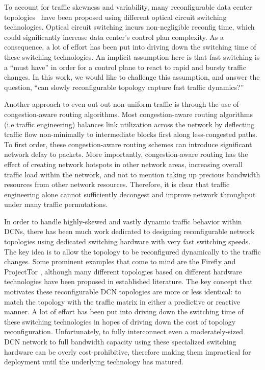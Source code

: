 \documentclass[sigconf]{acmart}
\theoremstyle{definition}
\begin{document}
To account for traffic skewness and variability, many reconfigurable data center topologies~\cite{farrington2011helios, cthrough_wang_2011, reactor_liu2014, hamedazimi2014firefly, ghobadi2016projector} have been proposed using different optical circuit switching technologies. Optical circuit switching incurs non-negligible reconfig time, which could significantly increase data center's control plan complexity. As a consequence, a lot of effort has been put into driving down the switching time of these switching technologies. An implicit assumption here is that fast switching is a ``must have'' in order for a control plane to react to rapid and bursty traffic changes. In this work, we would like to challenge this assumption, and answer the question, ``can slowly reconfigurable topology capture fast traffic dynamics?''

Another approach to even out out non-uniform traffic is through the use of congestion-aware routing algorithms. Most congestion-aware routing algorithms (i.e traffic engineering) balances link utilization across the network by deflecting traffic flow non-minimally to intermediate blocks first along less-congested paths. To first order, these congestion-aware routing schemes can introduce significant network delay to packets. More importantly, congestion-aware routing has the effect of creating network hotspots in other network areas, increasing overall traffic load within the network, and not to mention taking up precious bandwidth resources from other network resources. Therefore, it is clear that traffic engineering alone cannot sufficiently decongest and improve network throughput under many traffic permutations. 

In order to handle highly-skewed and vastly dynamic traffic behavior within DCNs, there has been much work dedicated to designing reconfigurable network topologies using dedicated switching hardware with very fast switching speeds. The key idea is to allow the topology to be reconfigured dynamically to the traffic changes. Some prominent examples that come to mind are the Firefly \cite{hamedazimi2014firefly} and ProjectTor \cite{ghobadi2016projector}, although many different topologies based on different hardware technologies have been proposed in established literature. The key concept that motivates these reconfigurable DCN topologies are more or less identical: to match the topology with the traffic matrix in either a predictive or reactive manner. A lot of effort has been put into driving down the switching time of these switching technologies in hopes of driving down the cost of topology reconfiguration. Unfortunately, to fully interconnect even a moderately-sized DCN network to full bandwidth capacity using these specialized switching hardware can be overly cost-prohibitive, therefore making them impractical for deployment until the underlying technology has matured.
\end{document}
